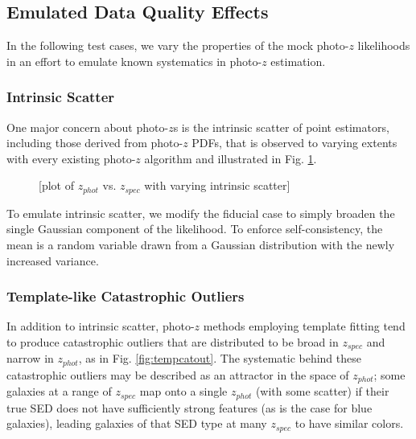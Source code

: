 \documentclass[iop]{emulateapj}
\begin{document}
\subsection{Emulated Data Quality Effects}
\label{sec:likelihoods}

In the following test cases, we vary the properties of the mock photo-$z$ likelihoods in an effort to emulate known systematics in photo-$z$ estimation.

\subsubsection{Intrinsic Scatter}
\label{sec:intscat}

One major concern about photo-$z$s is the intrinsic scatter of point estimators, including those derived from photo-$z$ PDFs, that is observed to varying extents with every existing photo-$z$ algorithm and illustrated in Fig. \ref{fig:intscat}.  

\begin{figure}
	\begin{center}
		\caption{[plot of $z_{phot}$ vs. $z_{spec}$ with varying intrinsic scatter]}
		\label{fig:intscat}
	\end{center}
\end{figure}

To emulate intrinsic scatter, we modify the fiducial case to simply broaden the single Gaussian component of the likelihood.  To enforce self-consistency, the mean is a random variable drawn from a Gaussian distribution with the newly increased variance.

\subsubsection{Template-like Catastrophic Outliers}
\label{sec:tempcatout}

In addition to intrinsic scatter, photo-$z$ methods employing template fitting tend to produce catastrophic outliers that are distributed to be broad in $z_{spec}$ and narrow in $z_{phot}$, as in Fig. \ref{fig:tempcatout}.  The systematic behind these catastrophic outliers may be described as an attractor in the space of $z_{phot}$; some galaxies at a range of $z_{spec}$ map onto a single $z_{phot}$ (with some scatter) if their true SED does not have sufficiently strong features (as is the case for blue galaxies), leading galaxies of that SED type at many $z_{spec}$ to have similar colors.
\end{document}
